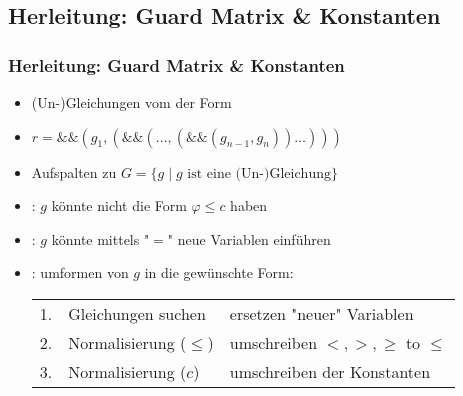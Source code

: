 \subsection{Herleitung: Guard Matrix \& Konstanten}
\begin{frame}
	\frametitle{Herleitung: Guard Matrix \& Konstanten}
	\begin{itemize}
		\item (Un-)Gleichungen vom \seg der Form
		\item[] \hspace{1cm} $r = \&\&(g_1,( \&\& (\dots,(\&\&(g_{n-1},g_n) )\dots)))$
%	
	
		\item Aufspalten zu $G=\{g \mid g \text{ ist eine (Un-)Gleichung}\}$
		\item<2-> : $g$ k\"onnte nicht die Form $\varphi \le c$ haben
		\item<3-> : $g$ k\"onnte mittels "$=$" neue Variablen einf\"uhren
		\item<4-> : umformen von $g$ in die gew\"unschte Form: 
			\begin{tabular}{cll}
				1. & Gleichungen suchen   & ersetzen "neuer" Variablen \\
				2. & Normalisierung ($\le$) & umschreiben $<,>,\ge$ to $\le$ \\
				3. & Normalisierung ($c$)   & umschreiben der Konstanten\\
			\end{tabular}
	\end{itemize}	
\end{frame}

